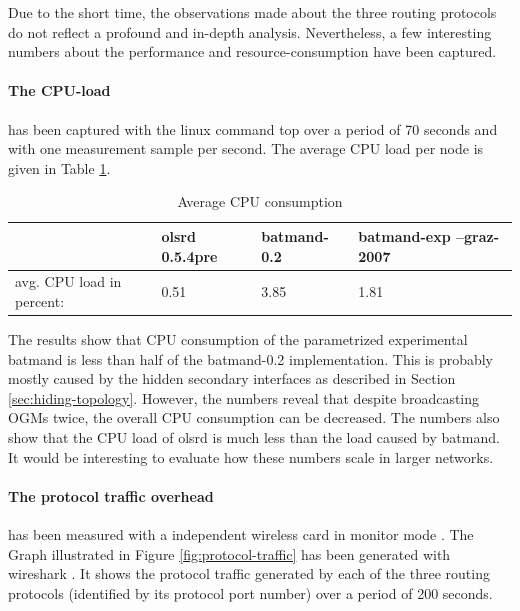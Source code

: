 \documentclass[11pt]{article}
\begin{document}
Due to the short time, the observations made about the three routing protocols do not reflect a profound and in-depth analysis. Nevertheless, a few interesting numbers about the performance and resource-consumption have been captured.

\paragraph{The CPU-load} has been captured with the linux command top over a period of 70 seconds and with one measurement sample per second. The average CPU load per node is given in Table \ref{tab:cpu-load}.




\begin{table}[htb]
\begin{center}
\begin{tabular}{|l||l|l|l|}
\hline
&olsrd 0.5.4pre & batmand-0.2 & batmand-exp --graz-2007 \\
\hline
avg. CPU load in percent: & 0.51 & 3.85 & 1.81 \\
\hline
\end{tabular}
\caption{Average CPU consumption}
\label{tab:cpu-load}
\end{center}
\end{table}%

The results show that CPU consumption of the parametrized experimental batmand is less than half of the batmand-0.2 implementation. This is probably mostly caused by the hidden secondary interfaces as described in Section \ref{sec:hiding-topology}.
%
However, the numbers reveal that despite broadcasting OGMs twice, the overall CPU consumption can be decreased.
The numbers also show that the CPU load of olsrd is much less than the load caused by batmand.
It would be interesting to evaluate how these numbers scale in larger networks.


\paragraph{The protocol traffic overhead} has been measured with a independent wireless card in monitor mode . The Graph illustrated in Figure \ref{fig:protocol-traffic} has been generated with wireshark \cite{wireshark}.
It shows the protocol traffic generated by each of the three routing protocols (identified by its protocol port number) over a period of 200 seconds.
\end{document}
